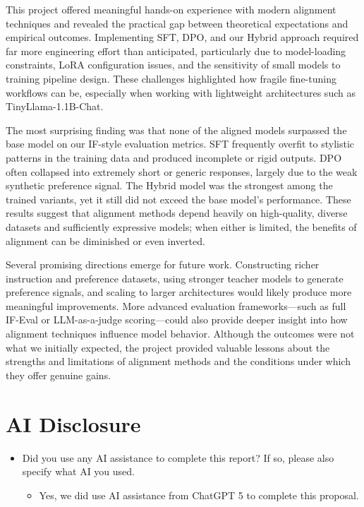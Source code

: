 \documentclass[11pt,a4paper]{article}
\begin{document}
This project offered meaningful hands-on experience with modern alignment techniques and revealed the practical gap between theoretical expectations and empirical outcomes. Implementing SFT, DPO, and our Hybrid approach required far more engineering effort than anticipated, particularly due to model-loading constraints, LoRA configuration issues, and the sensitivity of small models to training pipeline design. These challenges highlighted how fragile fine-tuning workflows can be, especially when working with lightweight architectures such as TinyLlama-1.1B-Chat.

The most surprising finding was that none of the aligned models surpassed the base model on our IF-style evaluation metrics. SFT frequently overfit to stylistic patterns in the training data and produced incomplete or rigid outputs. DPO often collapsed into extremely short or generic responses, largely due to the weak synthetic preference signal. The Hybrid model was the strongest among the trained variants, yet it still did not exceed the base model's performance. These results suggest that alignment methods depend heavily on high-quality, diverse datasets and sufficiently expressive models; when either is limited, the benefits of alignment can be diminished or even inverted.

Several promising directions emerge for future work. Constructing richer instruction and preference datasets, using stronger teacher models to generate preference signals, and scaling to larger architectures would likely produce more meaningful improvements. More advanced evaluation frameworks—such as full IF-Eval or LLM-as-a-judge scoring—could also provide deeper insight into how alignment techniques influence model behavior. Although the outcomes were not what we initially expected, the project provided valuable lessons about the strengths and limitations of alignment methods and the conditions under which they offer genuine gains.

\onecolumn
\section{AI Disclosure}
\begin{itemize}
    \item Did you use any AI assistance to complete this report? If so, please also specify what AI you used.
    \begin{itemize}
        \item{Yes, we did use AI assistance from ChatGPT 5 to complete this proposal.}
    \end{itemize}
\end{itemize}
\end{document}
